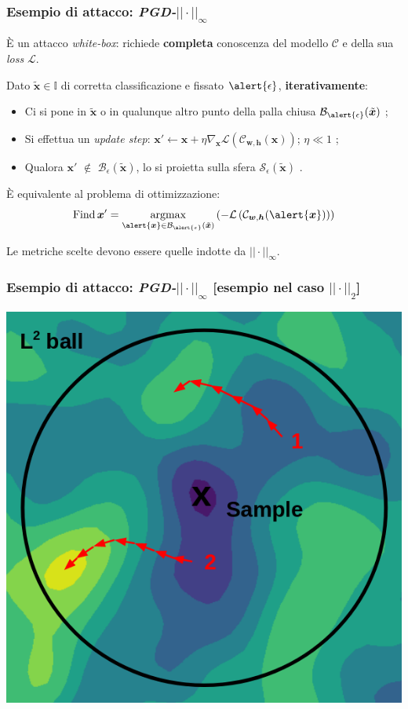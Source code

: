 \documentclass{beamer}
\DeclareMathOperator*{\argmax}{argmax}
\DeclareMathOperator*{\Find}{Find}
\begin{document}
{\begin{frame}
\end{frame}


\begin{frame}
	\frametitle{Esempio di attacco: \textit{PGD-${||\cdot||}_{\infty}$}}

	È un attacco \textit{white-box}: richiede \textbf{completa} conoscenza del modello $\mathcal{C}$ e della sua \textit{loss} $\mathcal{L}$.
	\hfill\break

	Dato $\tilde{\boldsymbol{x}} \in \mathbb{I}$ di corretta classificazione e fissato $\alert{\epsilon}$, \textbf{iterativamente}:
	\begin{itemize}
		\item {Ci si pone in $\tilde{\boldsymbol{x}}$ o in qualunque altro punto della palla chiusa $\mathcal{B}_{\alert{\epsilon}}{(\tilde{\boldsymbol{x}})}$ };
		\item { Si effettua un \textit{update step}: $\boldsymbol{x'} \leftarrow \boldsymbol{x} + {\eta} \nabla_{\boldsymbol{x}}\mathcal{L}\left(\mathcal{C}_{\boldsymbol{w}, \boldsymbol{h}}{\left({\boldsymbol{x}}\right)}\right)$; $\eta \ll 1$ };
		\item{ Qualora $\boldsymbol{x'}$ $\notin$  $\mathcal{B}_{{\epsilon}}{(\tilde{\boldsymbol{x}})}$, lo si proietta sulla sfera $\mathcal{S}_{{\epsilon}}{(\tilde{\boldsymbol{x}})}$ }.
	\end{itemize}




	\begin{block}{È equivalente al problema di ottimizzazione:}
		$$\Find \boldsymbol{x}' = \argmax_{\alert{\boldsymbol{x}} \in \mathcal{B}_{\alert{\epsilon}}{(\tilde{\boldsymbol{x}})}}\left(-\mathcal{L}\left(\mathcal{C}_{\boldsymbol{w}, \boldsymbol{h}}{\left(\alert{\boldsymbol{x}}\right)}\right)\right)$$
	\end{block}
\hfill\break
Le metriche scelte devono essere quelle indotte da ${||\cdot||}_{\infty}$.
\end{frame}


\begin{frame}
	\frametitle{Esempio di attacco: \textit{PGD-${||\cdot||}_{\infty}$} [esempio nel caso ${||\cdot||}_{2}$]}
	\center \includegraphics[height=0.60\linewidth]{pgdball.png}
\end{frame}

}
\end{document}

